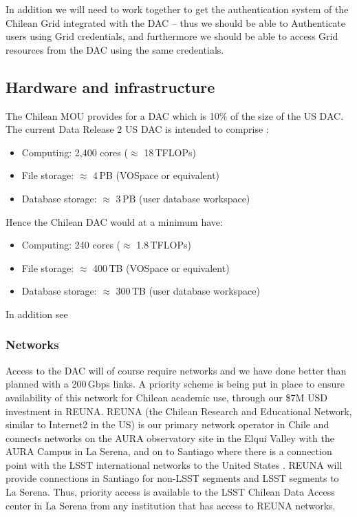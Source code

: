 In addition we will need to work together to get the authentication system of the Chilean Grid integrated with the DAC -- thus we should be able to Authenticate users using Grid credentials, and furthermore we should be able to access Grid resources from the DAC using the same credentials.


\subsection{Hardware and infrastructure}\label{sec:hw}

The Chilean MOU provides for a DAC which is 10\% of the size of the US DAC.
The current Data Release 2 US DAC is intended to comprise :
\begin{itemize}
\item Computing: 2,400 cores ($\approx$ 18\,TFLOPs)
\item File storage: $\approx$ 4\,PB  (VOSpace or equivalent)
\item Database storage: $\approx$ 3\,PB (user database workspace)

\end{itemize}

Hence the Chilean DAC would at a minimum have:
\begin{itemize}
\item Computing: 240 cores ($\approx$ 1.8\,TFLOPs)
\item File storage: $\approx$ 400\,TB  (VOSpace or equivalent)
\item Database storage: $\approx$ 300\,TB (user database workspace)

\end{itemize}

In addition see 


\subsubsection{Networks}

Access to the DAC will of course require networks and we have done better than planned with a 200\,Gbps links.
A priority scheme is being put in place to ensure availability of this network  for Chilean academic use, through our \$7M USD investment in REUNA.
REUNA (the Chilean Research and Educational Network, similar to Internet2 in the US) is our primary network operator in Chile and connects networks on the AURA observatory site in the Elqui Valley with the AURA Campus in La Serena, and on to Santiago where there is a connection point with the LSST international networks to the United States .
REUNA will provide connections in Santiago for non-LSST segments and LSST segments to La Serena.
Thus, priority access is available to the LSST Chilean Data Access center in La Serena from any institution that has access to REUNA networks.

